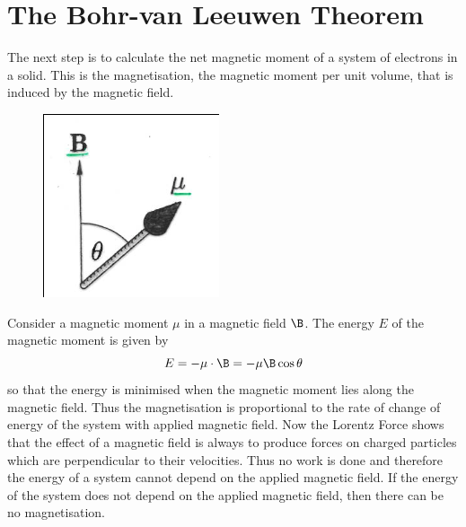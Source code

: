 \documentclass[a4paper, 11pt, normalem]{report}
\begin{document}
\section{The Bohr-van Leeuwen Theorem}
The next step is to calculate the net magnetic moment of a system of electrons in a solid.
This is the magnetisation, the magnetic moment per unit volume, that is induced by the magnetic field. 

\begin{figure}
    \centering
    \includegraphics[scale=0.4]{magnet.png}
\end{figure}
Consider a magnetic moment $\mu$ in a magnetic field $\B$. 
The energy $E$ of the magnetic moment is given by
\begin{equation}
    E = -\mu\cdot\B = -\mu\B\cos\theta
\end{equation}
so that the energy is minimised when the magnetic moment lies along the magnetic field. 
Thus the magnetisation is proportional to the rate of change of energy of the system with applied magnetic field. 
Now the Lorentz Force shows that the effect of a magnetic field is always to produce forces on charged particles which are perpendicular to their velocities. 
Thus no work is done and therefore the energy of a system cannot depend on the applied magnetic field. 
If the energy of the system does not depend on the applied magnetic field, then there can be no magnetisation.
\end{document}
